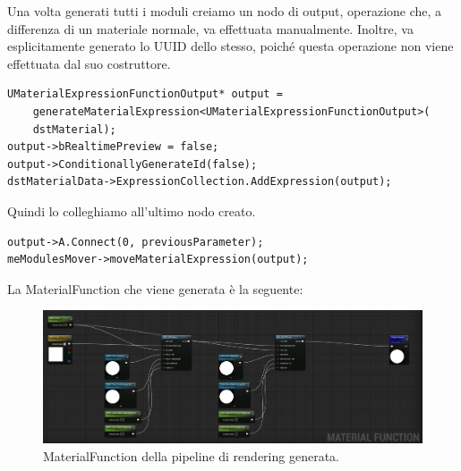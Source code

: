 \documentclass[main.tex]{subfiles}
\begin{document}
\noindent Una volta generati tutti i moduli creiamo un nodo di output, operazione che, a differenza di un materiale normale, va effettuata manualmente. Inoltre, va esplicitamente generato lo UUID dello stesso, poiché questa operazione non viene effettuata dal suo costruttore. 
\begin{lstlisting}
UMaterialExpressionFunctionOutput* output =
    generateMaterialExpression<UMaterialExpressionFunctionOutput>(
    dstMaterial);
output->bRealtimePreview = false;
output->ConditionallyGenerateId(false);
dstMaterialData->ExpressionCollection.AddExpression(output);
\end{lstlisting}
Quindi lo colleghiamo all'ultimo nodo creato.
\begin{lstlisting}
output->A.Connect(0, previousParameter);
meModulesMover->moveMaterialExpression(output);
\end{lstlisting}
\clearpage
La MaterialFunction che viene generata è la seguente:
\begin{figure}[H]
    \centering
    \includegraphics[width=1\linewidth]{img/renderingPipeline/GeneratedPipelineFull.jpg}
    \caption{MaterialFunction della pipeline di rendering generata.}
    \label{fig:2_generatedMFpipeline}
\end{figure}
\end{document}
